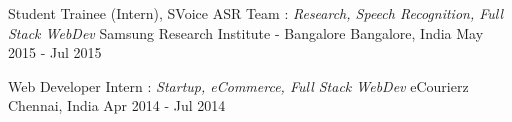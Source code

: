 \begin{cventries}
  \cventry
    {Student Trainee (Intern), SVoice ASR Team : \textit{Research, Speech Recognition, Full Stack WebDev}} %
    {Samsung Research Institute - Bangalore} %
    {Bangalore, India} %
    {May 2015 - Jul 2015} %
    {
    }

  \cventry
    {Web Developer Intern : \textit{Startup, eCommerce, Full Stack WebDev}} %
    {eCourierz} %
    {Chennai, India} %
    {Apr 2014 - Jul 2014} %
    {
    }


\end{cventries}
